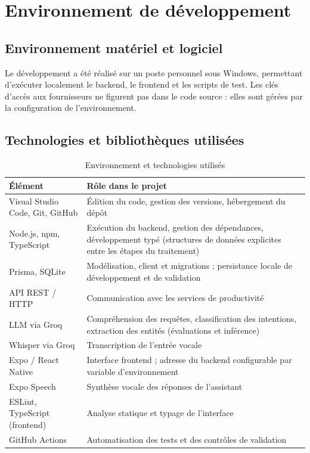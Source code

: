 \documentclass[11pt,a4paper,openany,oneside]{report}
\begin{document}
\section{Environnement de développement}
\subsection{Environnement matériel et logiciel}
Le développement a été réalisé sur un poste personnel sous Windows, permettant d'exécuter localement le backend, le frontend et les scripts de test. Les clés d'accès aux fournisseurs ne figurent pas dans le code source : elles sont gérées par la configuration de l'environnement.

\subsection{Technologies et bibliothèques utilisées}
\begin{table}[htbp]
\centering\small
\caption{Environnement et technologies utilisés}\label{tab:techno}
\begin{tabularx}{\textwidth}{@{}p{4.3cm}X@{}}
\toprule
\textbf{Élément} & \textbf{Rôle dans le projet} \\
\midrule
Visual Studio Code, Git, GitHub & Édition du code, gestion des versions, hébergement du dépôt \\
Node.js, npm, TypeScript & Exécution du backend, gestion des dépendances, développement typé (structures de données explicites entre les étapes du traitement) \\
Prisma, SQLite & Modélisation, client et migrations ; persistance locale de développement et de validation \\
API REST / HTTP & Communication avec les services de productivité \\
LLM via Groq & Compréhension des requêtes, classification des intentions, extraction des entités (évaluations et inférence) \\
Whisper via Groq & Transcription de l'entrée vocale \\
Expo / React Native & Interface frontend ; adresse du backend configurable par variable d'environnement \\
Expo Speech & Synthèse vocale des réponses de l'assistant \\
ESLint, TypeScript (frontend) & Analyse statique et typage de l'interface \\
GitHub Actions & Automatisation des tests et des contrôles de validation \\
\bottomrule
\end{tabularx}
\end{table}
\end{document}
